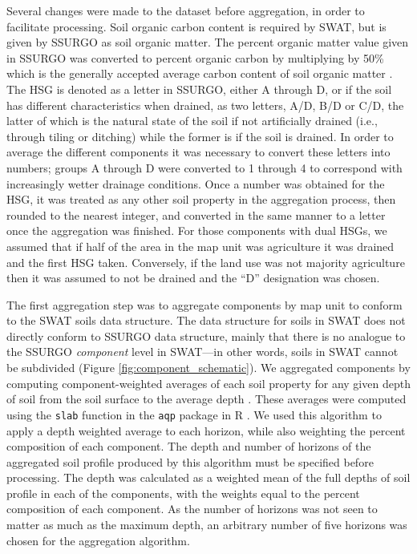 Several changes were made to the dataset before aggregation, in order to
facilitate processing. Soil organic carbon content is required by SWAT, but is
given by SSURGO as soil organic matter. The percent organic matter value given in SSURGO
was converted to percent organic carbon by multiplying by 50\% which is the generally accepted average carbon content of soil organic matter \citep{brady_elements_2004}. The HSG is
denoted as a letter in SSURGO, either A through D, or if the soil has different
characteristics when drained, as two letters, A/D, B/D or C/D, the latter of
which is the natural state of the soil if not artificially drained (i.e.,
through tiling or ditching) while the former is if the soil is drained.
In order to average the different components it was necessary to convert these letters
into numbers; groups A through D were converted to 1 through 4 to correspond
with increasingly wetter drainage conditions. Once a number was obtained for the
HSG, it was treated as any other soil property in the aggregation process,
then rounded to the nearest integer, and converted in the same manner to a letter
once the aggregation was finished. For those components with dual HSGs, we
assumed that if half of the area in the map unit was agriculture it was drained
and the first HSG taken. Conversely, if the land use was not majority agriculture
then it was assumed to not be drained and the ``D'' designation was chosen.

The first aggregation step was to aggregate components by map unit to conform to
the SWAT soils data structure. The data structure for soils in SWAT does not
directly conform to SSURGO data structure, mainly that there is no analogue to the
SSURGO \textit{component} level in SWAT---in other words, soils in SWAT cannot
be subdivided (Figure \ref{fig:component_schematic}). We aggregated components by computing
component-weighted averages of each soil property for any given depth of soil from the soil surface to the average depth \citep{gatzke_aggregation_2011, beaudette_algorithms_2013}.
These averages were computed using the \texttt{slab} function in the \texttt{aqp} package in R \citep{beaudette_algorithms_2013}. We
used this algorithm to apply a depth weighted average to each horizon, while
also weighting the percent composition of each component. The depth and number of horizons of
the aggregated soil profile produced by this algorithm must be specified before
processing. The depth was calculated as a weighted mean of the full depths of
soil profile in each of the components, with the weights equal to the percent composition of each
component. As the number of horizons was not seen to matter as much as the
maximum depth, an arbitrary number of five horizons was chosen for the
aggregation algorithm.

